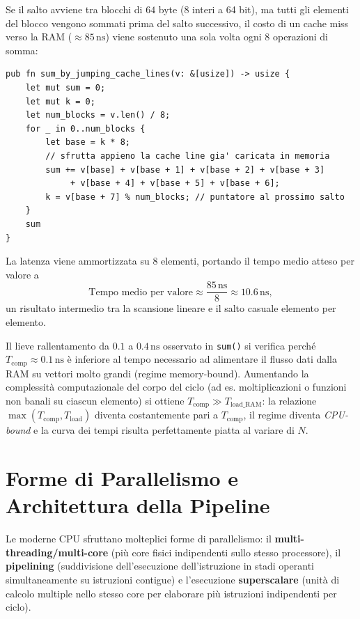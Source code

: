 \begin{example}
Se il salto avviene tra blocchi di $64$ byte (8 interi a 64 bit), ma tutti gli elementi del blocco vengono sommati prima del salto successivo, il costo di un cache miss verso la RAM ($\approx 85\,\text{ns}$) viene sostenuto una sola volta ogni $8$ operazioni di somma:
\begin{lstlisting}[style=rustcode]
pub fn sum_by_jumping_cache_lines(v: &[usize]) -> usize {
    let mut sum = 0;
    let mut k = 0;
    let num_blocks = v.len() / 8;
    for _ in 0..num_blocks {
        let base = k * 8;
        // sfrutta appieno la cache line gia' caricata in memoria
        sum += v[base] + v[base + 1] + v[base + 2] + v[base + 3]
             + v[base + 4] + v[base + 5] + v[base + 6];
        k = v[base + 7] % num_blocks; // puntatore al prossimo salto
    }
    sum
}
\end{lstlisting}
La latenza viene ammortizzata su $8$ elementi, portando il tempo medio atteso per valore a
\[
\text{Tempo medio per valore} \approx \frac{85\,\text{ns}}{8} \approx 10.6\,\text{ns},
\]
un risultato intermedio tra la scansione lineare e il salto casuale elemento per elemento.
\end{example}

\begin{remark}
Il lieve rallentamento da $0.1$ a $0.4\,\text{ns}$ osservato in \texttt{sum()} si verifica perch\'e $T_{\text{comp}} \approx 0.1\,\text{ns}$ \`e inferiore al tempo necessario ad alimentare il flusso dati dalla RAM su vettori molto grandi (regime memory-bound). Aumentando la complessit\`a computazionale del corpo del ciclo (ad es. moltiplicazioni o funzioni non banali su ciascun elemento) si ottiene $T_{\text{comp}} \gg T_{\text{load\_RAM}}$: la relazione $\max(T_{\text{comp}}, T_{\text{load}})$ diventa costantemente pari a $T_{\text{comp}}$, il regime diventa \textit{CPU-bound} e la curva dei tempi risulta perfettamente piatta al variare di $N$.
\end{remark}

\FloatBarrier
\section{Forme di Parallelismo e Architettura della Pipeline}

Le moderne CPU sfruttano molteplici forme di parallelismo: il \textbf{multi-threading/multi-core} (pi\`u core fisici indipendenti sullo stesso processore), il \textbf{pipelining} (suddivisione dell'esecuzione dell'istruzione in stadi operanti simultaneamente su istruzioni contigue) e l'esecuzione \textbf{superscalare} (unit\`a di calcolo multiple nello stesso core per elaborare pi\`u istruzioni indipendenti per ciclo).

